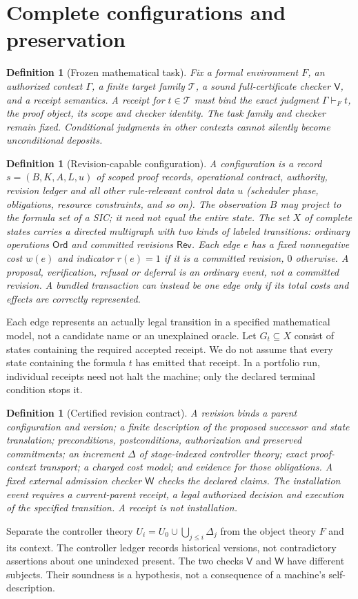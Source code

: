 \documentclass[11pt]{article}
\newtheorem{definition}[theorem]{Definition}
\theoremstyle{remark}\newtheorem{remark}[theorem]{Remark}
\newcommand{\Rev}{\mathsf{Rev}}
\newcommand{\Ord}{\mathsf{Ord}}
\newcommand{\W}{\mathsf W}
\newcommand{\V}{\mathsf V}
\begin{document}
\section{Complete configurations and preservation}
\begin{definition}[Frozen mathematical task]
Fix a formal environment $F$, an authorized context $\Gamma$, a finite target family $\mathcal T$, a sound full-certificate checker $\V$, and a receipt semantics. A receipt for $t\in\mathcal T$ must bind the exact judgment $\Gamma\vdash_F t$, the proof object, its scope and checker identity. The task family and checker remain fixed. Conditional judgments in other contexts cannot silently become unconditional deposits.
\end{definition}
\begin{definition}[Revision-capable configuration]
A configuration is a record $s=(B,K,A,L,u)$ of scoped proof records, operational contract, authority, revision ledger and all other rule-relevant control data $u$ (scheduler phase, obligations, resource constraints, and so on). The observation $B$ may project to the formula set of a SIC; it need not equal the entire state. The set $X$ of complete states carries a directed multigraph with two kinds of labeled transitions: ordinary operations $\Ord$ and committed revisions $\Rev$. Each edge $e$ has a fixed nonnegative cost $w(e)$ and indicator $r(e)=1$ if it is a committed revision, $0$ otherwise. A proposal, verification, refusal or deferral is an ordinary event, not a committed revision. A bundled transaction can instead be one edge only if its total costs and effects are correctly represented.
\end{definition}
Each edge represents an actually legal transition in a specified mathematical model, not a candidate name or an unexplained oracle. Let $G_t\subseteq X$ consist of states containing the required accepted receipt. We do not assume that every state containing the formula $t$ has emitted that receipt. In a portfolio run, individual receipts need not halt the machine; only the declared terminal condition stops it.

\begin{definition}[Certified revision contract]
A revision binds a parent configuration and version; a finite description of the proposed successor and state translation; preconditions, postconditions, authorization and preserved commitments; an increment $\Delta$ of stage-indexed controller theory; exact proof-context transport; a charged cost model; and evidence for those obligations. A fixed external admission checker $\W$ checks the declared claims. The installation event requires a current-parent receipt, a legal authorized decision and execution of the specified transition. A receipt is not installation.
\end{definition}
Separate the controller theory $U_i=U_0\cup\bigcup_{j\le i}\Delta_j$ from the object theory $F$ and its context. The controller ledger records historical versions, not contradictory assertions about one unindexed present. The two checks $\V$ and $\W$ have different subjects. Their soundness is a hypothesis, not a consequence of a machine's self-description.
\end{document}
